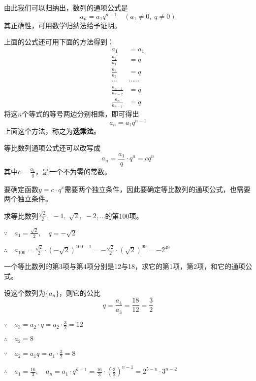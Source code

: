 由此我们可以归纳出，数列的通项公式是
\[a_n=a_1q^{n-1}\quad (a_1\ne 0,\; q\ne 0)\]
其正确性，可用数学归纳法给予证明。

上面的公式还可用下面的方法得到：
\[\begin{split}
    a_1&=a_1\\
    \frac{a_2}{a_1}&=q\\
    \frac{a_3}{a_2}&=q\\
    \cdots&\cdots\cdots\\
    \frac{a_{n-1}}{a_{n-2}}&=q\\
    \frac{a_n}{a_{n-1}}&=q
\end{split}\]
将这$n$个等式的等号两边分别相乘，即可得出
\[a_n=a_1q^{n-1}\]
上面这个方法，称之为\textbf{迭乘法}。

等比数列通项公式还可以改写成
\[a_n=\frac{a_1}{q}\cdot q^n=cq^n\]
其中$c=\frac{a_1}{q}$，是一个不为零的常数。

要确定函数$y=c\cdot q^x$需要两个独立条件，因此要确定等比数列的通项公式，也需要两个独立条件。

\begin{example}
    求等比数列$\frac{\sqrt{2}}{2},\; -1,\; \sqrt{2},\; -2,\ldots$的第100项。
\end{example}

\begin{solution}
$\because\quad a_1=\frac{\sqrt{2}}{2},\quad q=-\sqrt{2}$

$\therefore\quad a_{100}=\frac{\sqrt{2}}{2}\cdot \left(-\sqrt{2}\right)^{100-1}=-\frac{\sqrt{2}}{2}\cdot \left(\sqrt{2}\right)^{99}=-2^{49}$
\end{solution}

\begin{example}
    一个等比数列的第3项与第4项分别是12与18，求它的第1项，第2项，和它的通项公式。
\end{example}

\begin{solution}
设这个数列为$\{a_n\}$，则它的公比
\[q=\frac{a_4}{a_3}=\frac{18}{12}=\frac{3}{2}\]

$\because\quad a_3=a_2\cdot q=a_2\cdot \frac{3}{2}=12$

$\therefore\quad a_2=8$

$\because\quad a_2=a_1q=a_1\cdot \frac{3}{2}=8$

$\therefore\quad a_1=\frac{16}{3},\quad a_n=a_1\cdot q^{n-1}=\frac{16}{3}\cdot \left(\frac{3}{2}\right)^{n-1}=2^{5-n}\cdot 3^{n-2}$
\end{solution}



